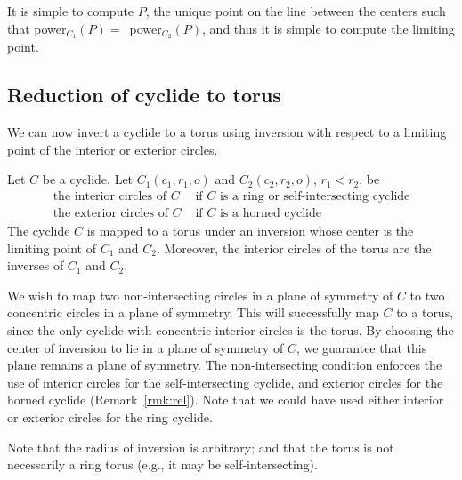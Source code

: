 
It is simple to compute $P$, the unique point on the line between the centers
such that \mbox{power$_{C_1}(P) =$ power$_{C_2}(P)$}, 
and thus it is simple to compute the limiting point.

\subsection{Reduction of cyclide to torus}

We can now invert a cyclide to a torus using 
inversion with respect to a limiting point of the interior or exterior circles.

\begin{theorem}
\label{cor:coi}
Let $C$ be a cyclide.
Let $C_1(c_1,r_1,o)$ and $C_2(c_2,r_2,o)$, $r_1 < r_2$, be 
\[
\begin{array}{ll}
\mbox{the interior circles of $C$} & \mbox{\ \ \ \ if $C$ is a ring or 
			self-intersecting cyclide} \\
\mbox{the exterior circles of $C$} & \mbox{\ \ \ \ if $C$ is a horned cyclide}
\end{array} 
\]
The cyclide $C$ is mapped to a torus under an inversion 
whose center is the limiting point of $C_1$ and $C_2$.
Moreover, the interior circles of the torus are the inverses of $C_1$ 
and $C_2$.
\end{theorem}
\prf
We wish to map two non-intersecting circles in a plane of symmetry of $C$
to two concentric circles in a plane of symmetry.
This will successfully map $C$ to a torus, since the only cyclide with 
concentric interior circles is the torus.
By choosing the center of inversion to lie in a plane of symmetry of $C$,
we guarantee that this plane remains a plane of symmetry.
The non-intersecting condition enforces the use of interior circles
for the self-intersecting cyclide, and exterior circles for the horned
cyclide (Remark~\ref{rmk:rel}).
Note that we could have used either interior or exterior circles for the ring
cyclide.
\QED


\begin{rmk}
Note that the radius of inversion is arbitrary;
and that the torus is not necessarily a ring torus (e.g., it may be 
self-intersecting).
\end{rmk}

